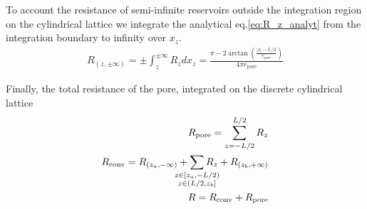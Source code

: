 \documentclass[10pt, a4paper]{article}
\begin{document}
\begin{multicols}{2}


To account the resistance of semi-infinite reservoirs outside the integration region on the cylindrical lattice we integrate the analytical eq.\ref{eq:R_z_analyt} from the integration boundary to infinity over $x_z$.
\begin{eqnarray}
    \label{eq:r_reservoir}
    R_{(z, \pm\infty)} = \pm \int_{z}^{\pm\infty} R_z dx_z= \frac{\pi - 2\arctan\left(\frac{|z|-L/2}{r_{\textrm{pore}}}\right)}{4\pi r_{\textrm{pore}}}
\end{eqnarray}

Finally, the total resistance of the pore, integrated on the discrete cylindrical lattice
\begin{eqnarray}
    R_{\textrm{pore}} = \sum_{z=-L/2}^{L/2} R_z
    \\
    R_{\textrm{conv}} = R_{(z_{a}, -\infty)} + \sum\limits_{\mathclap{\substack{z \in [z_{a},-L/2)\\z \in (L/2, z_b]}}} R_z + R_{(z_{b}, +\infty)}
    \\
    R = R_{\textrm{conv}} + R_{\textrm{pore}}
\end{eqnarray}

\end{multicols}
\end{document}
